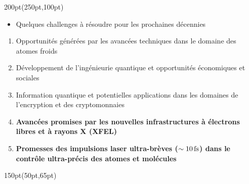 \begin{frame}
\begin{textblock*}{200pt}(250pt,100pt)
\scriptsize
\begin{itemize}
\item Quelques challenges \`a r\'esoudre pour les prochaines d\'ecennies
\end{itemize}
\begin{enumerate}
\item \scriptsize Opportunit\'es g\'en\'er\'ees par 
les avanc\'ees techniques dans le domaine des atomes froids 
\item \scriptsize D\'eveloppement de l'ing\'enieurie quantique et 
opportunit\'es \'economiques et sociales
\item \scriptsize Information quantique et potentielles 
applications dans les domaines de l'encryption et des cryptomonnaies
\item \scriptsize \textbf{Avanc\'ees promises par les 
nouvelles infrastructures \`a \'electrons libres et \`a rayons X (XFEL)}
\item \scriptsize \textbf{Promesses des impulsions laser ultra-br\`eves 
($\sim 10\,\rm fs$)
dans le contr\^ole ultra-pr\'ecis des atomes et mol\'ecules}
\end{enumerate}
\end{textblock*}

\begin{textblock*}{150pt}(50pt,65pt)
\end{textblock*}

\end{frame}


